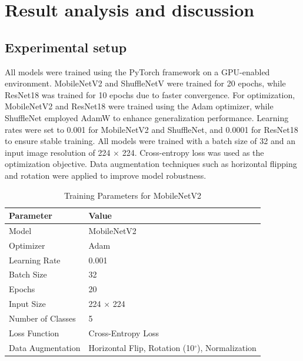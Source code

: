 \chapter{Result analysis and discussion}


\section{Experimental setup}
All models were trained using the PyTorch framework on a GPU-enabled environment. MobileNetV2 and ShuffleNetV were trained for 20 epochs, while ResNet18 was trained for 10 epochs due to faster convergence. For optimization, MobileNetV2 and ResNet18 were trained using the Adam optimizer, while ShuffleNet employed AdamW to enhance generalization performance. Learning rates were set to 0.001 for MobileNetV2 and ShuffleNet, and 0.0001 for ResNet18 to ensure stable training. All models were trained with a batch size of 32 and an input image resolution of 224 × 224. Cross-entropy loss was used as the optimization objective. Data augmentation techniques such as horizontal flipping and rotation were applied to improve model robustness.
\begin{table}[H]

\label{tab:mobilenet_params}
\begin{tabular}{ll}
\toprule
\textbf{Parameter} & \textbf{Value} \\
\midrule
Model & MobileNetV2 \\
Optimizer & Adam \\
Learning Rate & 0.001 \\
Batch Size & 32 \\
Epochs & 20 \\
Input Size & 224 $\times$ 224 \\
Number of Classes & 5 \\
Loss Function & Cross-Entropy Loss \\
Data Augmentation & Horizontal Flip, Rotation (10$^\circ$), Normalization \\
\bottomrule
\end{tabular}
\centering
\caption{Training Parameters for MobileNetV2}
\end{table}

